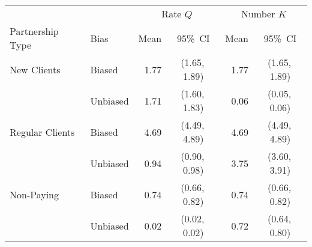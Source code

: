 \begin{tabular}{llrcrc}
  \toprule
   & & \multicolumn{2}{c}{Rate $Q$} &
       \multicolumn{2}{c}{Number $K$} \\
  \cmidrule(rl){3-4}\cmidrule(rl){5-6}
  Partnership Type & Bias & Mean & 95\%~CI & Mean & 95\%~CI \\
  \midrule
  New Clients     & Biased   & 1.77 & (1.65,\,1.89) & 1.77 & (1.65,\,1.89) \\
                  & Unbiased & 1.71 & (1.60,\,1.83) & 0.06 & (0.05,\,0.06) \\
  Regular Clients & Biased   & 4.69 & (4.49,\,4.89) & 4.69 & (4.49,\,4.89) \\
                  & Unbiased & 0.94 & (0.90,\,0.98) & 3.75 & (3.60,\,3.91) \\
  Non-Paying      & Biased   & 0.74 & (0.66,\,0.82) & 0.74 & (0.66,\,0.82) \\
                  & Unbiased & 0.02 & (0.02,\,0.02) & 0.72 & (0.64,\,0.80) \\
  \bottomrule
\end{tabular}
